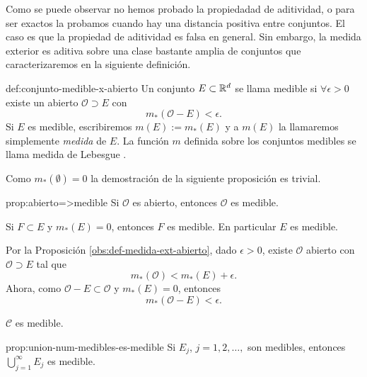 Como se puede observar no hemos probado la propiedadad de aditividad, o para ser exactos la probamos cuando hay una distancia positiva entre conjuntos. El caso es que la propiedad de aditividad es falsa en general. Sin embargo,  la medida exterior es aditiva sobre una clase bastante amplia de conjuntos que caracterizaremos en la  siguiente definición.

\begin{definicion}{def:conjunto-medible-x-abierto}
Un conjunto $E\subset \mathbb{R}^d$ se llama medible si $\forall \epsilon>0$ existe un abierto $\mathcal{O}\supset E$
con 
\[
m_{*}(\mathcal{O}-E)<\epsilon.
\]
Si $E$ es medible, escribiremos $m(E):=m_{*}(E)$ y a $m(E)$ la llamaremos simplemente \emph{medida} de $E$. La función $m$ definida sobre los conjuntos medibles se llama medida de Lebesgue .
\end{definicion}

Como $m_*(\emptyset)=0$ la demostración de la siguiente proposición es trivial. 

\begin{proposicion}{prop:abierto=>medible}
Si $\mathcal{O}$ es abierto, entonces $\mathcal{O}$ es medible.
\end{proposicion}

 
\begin{proposicion}{}
 Si $F\subset E$ y $m_{*}(E)=0$, entonces $F$ es medible. En particular $E$ es medible.
\end{proposicion}

\begin{demo}
  Por la Proposición \ref{obs:def-medida-ext-abierto}, 
    dado $\epsilon>0$, existe $\mathcal{O}$ abierto con $\mathcal{O}\supset E$ tal que 
    \[
    m_{*}(\mathcal{O})<m_{*}(E)+\epsilon.
    \]
    Ahora, como $\mathcal{O}-E \subset \mathcal{O}$ y $m_{*}(E)=0$, entonces 
    \[
    m_{*}(\mathcal{O}-E)<\epsilon.
    \]
 
\end{demo}

\begin{observacion}{}
$\mathscr{C}$ es medible.
\end{observacion}



\begin{proposicion}{prop:union-num-medibles-es-medible}
Si $E_j$, $j=1,2,\ldots,$ son medibles, entonces $\bigcup\limits_{j=1}^{\infty} E_j$ 
es medible.
\end{proposicion}

